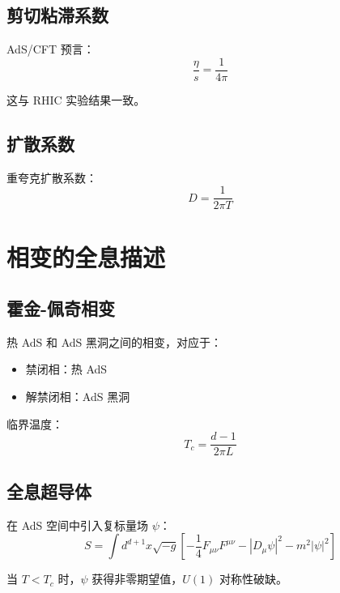\documentclass[12pt,a4paper]{ctexart}
\begin{document}
\subsection{剪切粘滞系数}

AdS/CFT 预言：
\begin{equation}
    \frac{\eta}{s} = \frac{1}{4\pi}
\end{equation}

这与 RHIC 实验结果一致。

\subsection{扩散系数}

重夸克扩散系数：
\begin{equation}
    D = \frac{1}{2\pi T}
\end{equation}

\section{相变的全息描述}

\subsection{霍金-佩奇相变}

热 AdS 和 AdS 黑洞之间的相变，对应于：
\begin{itemize}
    \item 禁闭相：热 AdS
    \item 解禁闭相：AdS 黑洞
\end{itemize}

临界温度：
\begin{equation}
    T_c = \frac{d-1}{2\pi L}
\end{equation}

\subsection{全息超导体}

在 AdS 空间中引入复标量场 $\psi$：
\begin{equation}
    S = \int d^{d+1}x \sqrt{-g} \left[ -\frac{1}{4}F_{\mu\nu}F^{\mu\nu}
    - |D_\mu \psi|^2 - m^2 |\psi|^2 \right]
\end{equation}

当 $T < T_c$ 时，$\psi$ 获得非零期望值，$U(1)$ 对称性破缺。
\end{document}
